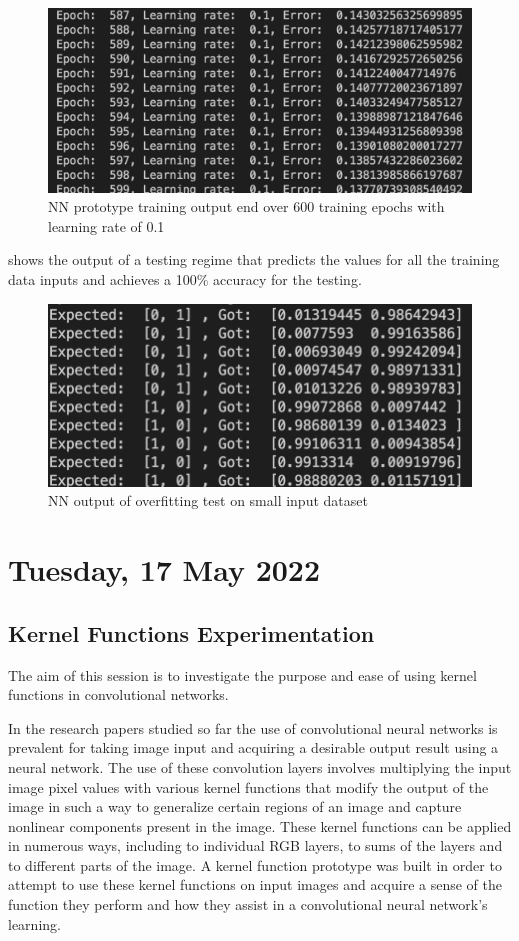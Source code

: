 \begin{figure}[h]
    \centering
    \includegraphics[width=0.7\linewidth]{figures/NN_prototype_lrate_0.1_600_epochs_end.png}
    \caption{NN prototype training output end over 600 training epochs with learning rate of 0.1}
    \label{fig:NN_prototype_lrate_0.1_600_epochs_end}
\end{figure}

 shows the output of a testing regime that predicts the values for all the training data inputs and achieves a 100\% accuracy for the testing.

\begin{figure}[h]
    \centering
    \includegraphics[width=0.7\linewidth]{figures/NN_prototype_overfitting_test.png}
    \caption{NN output of overfitting test on small input dataset}
    \label{fig:NN_prototype_overfitting_test}
\end{figure}

\section[2022/05/17]{Tuesday, 17 May 2022}

\subsection{Kernel Functions Experimentation}

The aim of this session is to investigate the purpose and ease of using kernel functions in convolutional networks.


In the research papers studied so far the use of convolutional neural networks is prevalent for taking image input and acquiring a desirable output result using a neural network. The use of these convolution layers involves multiplying the input image pixel values with various kernel functions that modify the output of the image in such a way to generalize certain regions of an image and capture nonlinear components present in the image. These kernel functions can be applied in numerous ways, including to individual RGB layers, to sums of the layers and to different parts of the image. A kernel function prototype was built in order to attempt to use these kernel functions on input images and acquire a sense of the function they perform and how they assist in a convolutional neural network's learning. \\

